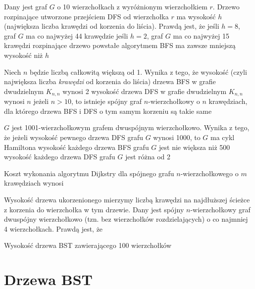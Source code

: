 \begin{problems}
    \prob Dany jest graf $G$ o 10 wierzchołkach z wyróżnionym wierzchołkiem $r$. Drzewo rozpinające utworzone przejściem DFS od wierzchołka $r$ ma wysokość $h$ (największa liczba krawędzi od korzenia do liścia). Prawdą jest, że
    \answers
    {jeśli $h = 8$, graf $G$ ma co najwyżej 44 krawędzie}
    {jeśli $h = 2$, graf $G$ ma co najwyżej 15 krawędzi}
    {rozpinające drzewo powstałe algorytmem BFS ma zawsze mniejszą wysokość niż $h$}

    \prob Niech $n$ będzie liczbą całkowitą większą od 1. Wynika z tego, że
    \answers
    {wysokość (czyli największa liczba \emph{krawędzi} od korzenia do liścia) drzewa BFS w grafie dwudzielnym $K_{n,n}$ wynosi 2}
    {wysokość drzewa DFS w grafie dwudzielnym $K_{n,n}$ wynosi $n$}
    {jeżeli $n > 10$, to istnieje spójny graf $n$-wierzchołkowy o $n$ krawędziach, dla którego drzewa BFS i DFS o tym samym korzeniu są takie same}

    \prob $G$ jest 1001-wierzchołkowym grafem dwuspójnym wierzchołkowo. Wynika z tego, że
    \answers
    {jeżeli wysokość pewnego drzewa DFS grafu $G$ wynosi 1000, to $G$ ma cykl Hamiltona}
    {wysokość każdego drzewa BFS grafu $G$ jest nie większa niż 500}
    {wysokość każdego drzewa DFS grafu $G$ jest różna od 2}

    \prob Koszt wykonania algorytmu Dijkstry dla spójnego grafu $n$-wierzchołkowego o $m$ krawędziach wynosi

    \prob Wysokość drzewa ukorzenionego mierzymy liczbą krawędzi na najdłuższej ścieżce z korzenia do wierzchołka w tym drzewie. Dany jest spójny $n$-wierzchołkowy graf dwuspójny wierzchołkowo (tzn. bez wierzchołków rozdzielających) o co najmniej 4 wierzchołkach. Prawdą jest, że

    \prob Wysokość drzewa BST zawierającego 100 wierzchołków
\end{problems}

\section{Drzewa BST}

